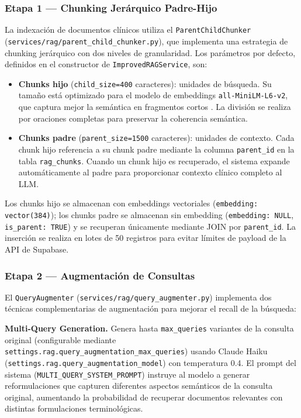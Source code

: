 \subsubsection{Etapa 1 — Chunking Jerárquico Padre-Hijo}
\label{sec:chunking}

La indexación de documentos clínicos utiliza el \texttt{ParentChildChunker} (\texttt{services/rag/parent\_child\_chunker.py}), que implementa una estrategia de chunking jerárquico con dos niveles de granularidad. Los parámetros por defecto, definidos en el constructor de \texttt{ImprovedRAGService}, son:

\begin{itemize}[nosep, leftmargin=*]
  \item \textbf{Chunks hijo} (\texttt{child\_size=400} caracteres): unidades de búsqueda. Su tamaño está optimizado para el modelo de embeddings \texttt{all-MiniLM-L6-v2}, que captura mejor la semántica en fragmentos cortos \citep{Wang2020}. La división se realiza por oraciones completas para preservar la coherencia semántica.
  \item \textbf{Chunks padre} (\texttt{parent\_size=1500} caracteres): unidades de contexto. Cada chunk hijo referencia a su chunk padre mediante la columna \texttt{parent\_id} en la tabla \texttt{rag\_chunks}. Cuando un chunk hijo es recuperado, el sistema expande automáticamente al padre para proporcionar contexto clínico completo al LLM.
\end{itemize}

Los chunks hijo se almacenan con embeddings vectoriales (\texttt{embedding: vector(384)}); los chunks padre se almacenan sin embedding (\texttt{embedding: NULL}, \texttt{is\_parent: TRUE}) y se recuperan únicamente mediante JOIN por \texttt{parent\_id}. La inserción se realiza en lotes de 50 registros para evitar límites de payload de la API de Supabase.

\subsubsection{Etapa 2 — Augmentación de Consultas}
\label{sec:query_augmentation}

El \texttt{QueryAugmenter} (\texttt{services/rag/query\_augmenter.py}) implementa dos técnicas complementarias de augmentación para mejorar el recall de la búsqueda:

\textbf{Multi-Query Generation.} Genera hasta \texttt{max\_queries} variantes de la consulta original (configurable mediante \texttt{settings.rag.query\_augmentation\_max\_queries}) usando Claude Haiku (\texttt{settings.rag.query\_augmentation\_model}) con temperatura 0.4. El prompt del sistema (\texttt{MULTI\_QUERY\_SYSTEM\_PROMPT}) instruye al modelo a generar reformulaciones que capturen diferentes aspectos semánticos de la consulta original, aumentando la probabilidad de recuperar documentos relevantes con distintas formulaciones terminológicas.

